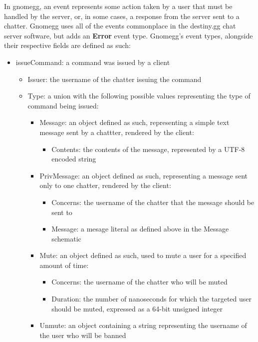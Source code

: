 \documentclass{article}
\begin{document}
In gnomegg, an event represents some action taken by a user that must be
handled by the server, or, in some cases, a response from the server sent to a
chatter. Gnomegg uses all of the events commonplace in the destiny.gg chat server
software, but adds an \textbf{Error} event type. Gnomegg's event types,
alongside their respective fields are defined as such:

\begin{itemize}
	\item issueCommand: a command was issued by a client
		\begin{itemize}
			\item Issuer: the username of the chatter issuing the command
			\item Type: a union with the following possible values representing
				the type of command being issued:
				\begin{itemize}
					\item Message: an object defined as such, representing a
						simple text message sent by a chattter, rendered by the
						client:
						\begin{itemize}
							\item Contents: the contents of the message,
								represented by a UTF-8 encoded string
						\end{itemize}
					\item PrivMessage: an object defined as such, representing
						a message sent only to one chatter, rendered by the client:
						\begin{itemize}
							\item Concerns: the username of the chatter that the
								message should be sent to
							\item Message: a mesage literal as defined above in
								the Message schematic
						\end{itemize}
					\item Mute: an object defined as such, used to mute a user for
						a specified amount of time:
						\begin{itemize}
							\item Concerns: the username of the chatter who will
								be muted
							\item Duration: the number of nanoseconds for which
								the targeted user should be muted, expressed as
								a 64-bit unsigned integer
						\end{itemize}
					\item Unmute: an object containing a string representing
						the username of the user who will be banned

\end{itemize}
\end{itemize}
\end{itemize}
\end{document}
